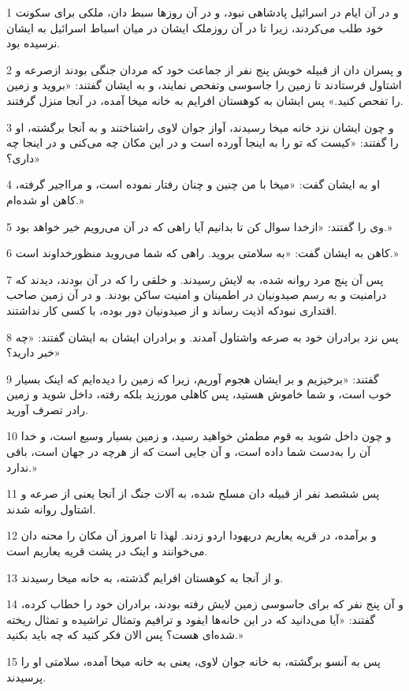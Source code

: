 \par 1 و در آن ایام در اسرائیل پادشاهی نبود، و در آن روزها سبط دان، ملکی برای سکونت خود طلب می‌کردند، زیرا تا در آن روزملک ایشان در میان اسباط اسرائیل به ایشان نرسیده بود.
\par 2 و پسران دان از قبیله خویش پنج نفر از جماعت خود که مردان جنگی بودند ازصرعه و اشتاول فرستادند تا زمین را جاسوسی وتفحص نمایند، و به ایشان گفتند: «بروید و زمین را تفحص کنید.» پس ایشان به کوهستان افرایم به خانه میخا آمده، در آنجا منزل گرفتند.
\par 3 و چون ایشان نزد خانه میخا رسیدند، آواز جوان لاوی راشناختند و به آنجا برگشته، او را گفتند: «کیست که تو را به اینجا آورده است و در این مکان چه می‌کنی و در اینجا چه داری؟»
\par 4 او به ایشان گفت: «میخا با من چنین و چنان رفتار نموده است، و مرااجیر گرفته، کاهن او شده‌ام.»
\par 5 وی را گفتند: «ازخدا سوال کن تا بدانیم آیا راهی که در آن می‌رویم خیر خواهد بود.»
\par 6 کاهن به ایشان گفت: «به سلامتی بروید. راهی که شما می‌روید منظورخداوند است.»
\par 7 پس آن پنج مرد روانه شده، به لایش رسیدند. و خلقی را که در آن بودند، دیدند که درامنیت و به رسم صیدونیان در اطمینان و امنیت ساکن بودند. و در آن زمین صاحب اقتداری نبودکه اذیت رساند و از صیدونیان دور بوده، با کسی کار نداشتند.
\par 8 پس نزد برادران خود به صرعه واشتاول آمدند. و برادران ایشان به ایشان گفتند: «چه خبر دارید؟»
\par 9 گفتند: «برخیزیم و بر ایشان هجوم آوریم، زیرا که زمین را دیده‌ایم که اینک بسیار خوب است، و شما خاموش هستید، پس کاهلی مورزید بلکه رفته، داخل شوید و زمین رادر تصرف آورید.
\par 10 و چون داخل شوید به قوم مطمئن خواهید رسید، و زمین بسیار وسیع است، و خدا آن را به‌دست شما داده است، و آن جایی است که از هرچه در جهان است، باقی ندارد.»
\par 11 پس ششصد نفر از قبیله دان مسلح شده، به آلات جنگ از آنجا یعنی از صرعه و اشتاول روانه شدند.
\par 12 و برآمده، در قریه یعاریم دریهودا اردو زدند. لهذا تا امروز آن مکان را محنه دان می‌خوانند و اینک در پشت قریه یعاریم است.
\par 13 و از آنجا به کوهستان افرایم گذشته، به خانه میخا رسیدند.
\par 14 و آن پنج نفر که برای جاسوسی زمین لایش رفته بودند، برادران خود را خطاب کرده، گفتند: «آیا می‌دانید که در این خانه‌ها ایفود و ترافیم وتمثال تراشیده و تمثال ریخته شده‌ای هست؟ پس الان فکر کنید که چه باید بکنید.»
\par 15 پس به آنسو برگشته، به خانه جوان لاوی، یعنی به خانه میخا آمده، سلامتی او را پرسیدند.
